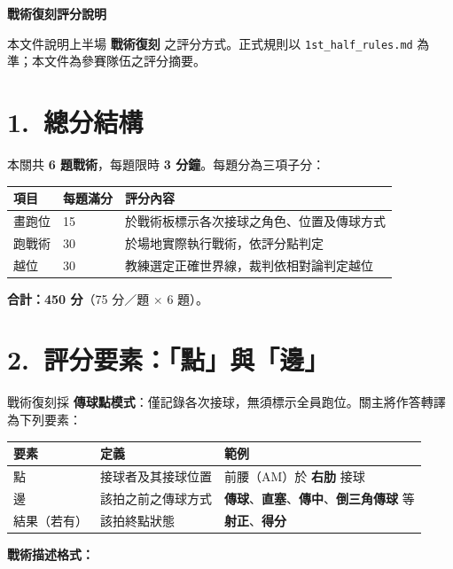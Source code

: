 \documentclass[11pt]{article}
\newcommand{\term}[1]{\textbf{#1}}
\begin{document}
{\LARGE\bfseries 戰術復刻評分說明\par}
\vspace{0.6em}
\noindent
本文件說明上半場 \term{戰術復刻} 之評分方式。正式規則以 \texttt{1st\_half\_rules.md} 為準；本文件為參賽隊伍之評分摘要。

\section*{1.\ 總分結構}

本關共 \term{6 題戰術}，每題限時 \term{3 分鐘}。每題分為三項子分：

\vspace{0.4em}
\begin{tabular}{@{}lll@{}}
\toprule
\textbf{項目} & \textbf{每題滿分} & \textbf{評分內容} \\
\midrule
畫跑位 & 15 & 於戰術板標示各次接球之角色、位置及傳球方式 \\
跑戰術 & 30 & 於場地實際執行戰術，依評分點判定 \\
越位 & 30 & 教練選定正確世界線，裁判依相對論判定越位 \\
\bottomrule
\end{tabular}

\vspace{0.4em}
\noindent
\textbf{合計：450 分}（75 分／題 $\times$ 6 題）。

\section*{2.\ 評分要素：「點」與「邊」}

戰術復刻採 \term{傳球點模式}：僅記錄各次接球，無須標示全員跑位。關主將作答轉譯為下列要素：

\vspace{0.4em}
\begin{tabular}{@{}p{2.2cm}p{4.2cm}p{6.8cm}@{}}
\toprule
\textbf{要素} & \textbf{定義} & \textbf{範例} \\
\midrule
點 & 接球者及其接球位置 & 前腰（AM）於 \term{右肋} 接球 \\
邊 & 該拍之前之傳球方式 & \term{傳球}、\term{直塞}、\term{傳中}、\term{倒三角傳球} 等 \\
結果（若有） & 該拍終點狀態 & \term{射正}、\term{得分} \\
\bottomrule
\end{tabular}

\vspace{0.6em}
\noindent\textbf{戰術描述格式：}
\end{document}
